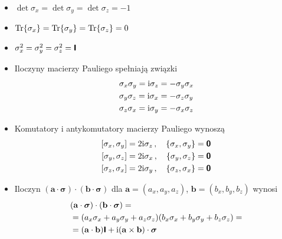 \documentclass{myclass}
\begin{document}
\begin{itemize}
    
    \item \(\det{\sigma_x} = \det{\sigma_y} = \det{\sigma_z} = -1\)

    \item \(\Tr{\sigma_x} = \Tr{\sigma_y} = \Tr{\sigma_z} = 0\)

    \item \(\sigma_x^2 = \sigma_y^2 = \sigma_z^2 = \boldsymbol{\mathsf{I}}\)

    \item Iloczyny macierzy Pauliego spełniają związki
    \begin{equation*}
        \begin{split}
            &\sigma_x\sigma_y = \mathrm{i}\sigma_z = -\sigma_y\sigma_x \\
            &\sigma_y\sigma_z = \mathrm{i}\sigma_x = -\sigma_z\sigma_y \\
            &\sigma_z\sigma_x = \mathrm{i}\sigma_y = -\sigma_x\sigma_z
        \end{split}
    \end{equation*}

    \item Komutatory i antykomutatory macierzy Pauliego wynoszą
    \begin{equation*}
        \begin{split}
            [\sigma_x,\sigma_y] = 2\mathrm{i}\sigma_z\,,\quad \{\sigma_x, \sigma_y\} = \boldsymbol{\mathsf{\mathsf{0}}}\\
            [\sigma_y,\sigma_z] = 2\mathrm{i}\sigma_x\,,\quad \{\sigma_y, \sigma_z\} = \boldsymbol{\mathsf{\mathsf{0}}}\\
            [\sigma_z,\sigma_x] = 2\mathrm{i}\sigma_y\,,\quad \{\sigma_z, \sigma_x\} = \boldsymbol{\mathsf{\mathsf{0}}}\\
        \end{split}
    \end{equation*}

    \item Iloczyn \((\mathbf{a}\cdot\boldsymbol{\sigma})\cdot(\mathbf{b}\cdot\boldsymbol{\sigma})\)
    dla \(\mathbf{a} = (a_x,a_y,a_z)\), \(\mathbf{b}=(b_x,b_y,b_z)\) wynosi
    \begin{equation*}
        \begin{split}
            &(\mathbf{a}\cdot\boldsymbol{\sigma})\cdot(\mathbf{b}\cdot\boldsymbol{\sigma}) = \\
            &= (a_x\sigma_x + a_y\sigma_y + a_z\sigma_z)(b_x\sigma_x + b_y\sigma_y + b_z\sigma_z) =\\
            &= (\mathbf{a}\cdot\mathbf{b})\boldsymbol{\mathsf{I}} + \mathrm{i}(\mathbf{a}\times\mathbf{b})\cdot\boldsymbol{\sigma}
        \end{split}
    \end{equation*}


\end{itemize}
\end{document}

